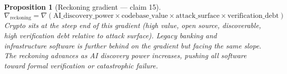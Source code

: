 \documentclass[11pt,a4paper]{article}
\newtheorem{proposition}[definition]{Proposition}
\begin{document}
\begin{proposition}[Reckoning gradient --- claim 15]
\label{prop:reckoning}
\[
  \nabla_{\text{reckoning}} = \nabla\left(\text{AI\_discovery\_power}
    \times \text{codebase\_value} \times \text{attack\_surface}
    \times \text{verification\_debt}\right)
\]
Crypto sits at the steep end of this gradient (high value, open source,
discoverable, high verification debt relative to attack surface).
Legacy banking and infrastructure software is further behind on the
gradient but facing the same slope. The reckoning advances as AI
discovery power increases, pushing all software toward formal
verification or catastrophic failure.
\end{proposition}
\end{document}
